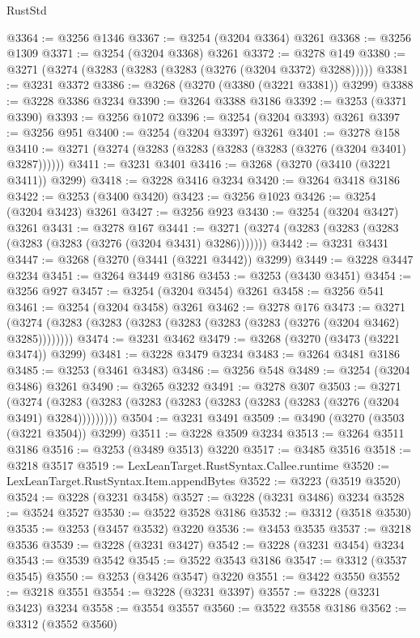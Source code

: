\begin{lexlean}{RustStd}
\begin{coremodule}
@3364 := @3256 @1346
@3367 := @3254 (@3204 @3364) @3261
@3368 := @3256 @1309
@3371 := @3254 (@3204 @3368) @3261
@3372 := @3278 @149
@3380 := @3271 (@3274 (@3283 (@3283 (@3283 (@3276 (@3204 @3372) @3288)))))
@3381 := @3231 @3372
@3386 := @3268 (@3270 (@3380 (@3221 @3381)) @3299)
@3388 := @3228 @3386 @3234
@3390 := @3264 @3388 @3186
@3392 := @3253 (@3371 @3390)
@3393 := @3256 @1072
@3396 := @3254 (@3204 @3393) @3261
@3397 := @3256 @951
@3400 := @3254 (@3204 @3397) @3261
@3401 := @3278 @158
@3410 := @3271 (@3274 (@3283 (@3283 (@3283 (@3283 (@3276 (@3204 @3401) @3287))))))
@3411 := @3231 @3401
@3416 := @3268 (@3270 (@3410 (@3221 @3411)) @3299)
@3418 := @3228 @3416 @3234
@3420 := @3264 @3418 @3186
@3422 := @3253 (@3400 @3420)
@3423 := @3256 @1023
@3426 := @3254 (@3204 @3423) @3261
@3427 := @3256 @923
@3430 := @3254 (@3204 @3427) @3261
@3431 := @3278 @167
@3441 := @3271 (@3274 (@3283 (@3283 (@3283 (@3283 (@3283 (@3276 (@3204 @3431) @3286)))))))
@3442 := @3231 @3431
@3447 := @3268 (@3270 (@3441 (@3221 @3442)) @3299)
@3449 := @3228 @3447 @3234
@3451 := @3264 @3449 @3186
@3453 := @3253 (@3430 @3451)
@3454 := @3256 @927
@3457 := @3254 (@3204 @3454) @3261
@3458 := @3256 @541
@3461 := @3254 (@3204 @3458) @3261
@3462 := @3278 @176
@3473 := @3271 (@3274 (@3283 (@3283 (@3283 (@3283 (@3283 (@3283 (@3276 (@3204 @3462) @3285))))))))
@3474 := @3231 @3462
@3479 := @3268 (@3270 (@3473 (@3221 @3474)) @3299)
@3481 := @3228 @3479 @3234
@3483 := @3264 @3481 @3186
@3485 := @3253 (@3461 @3483)
@3486 := @3256 @548
@3489 := @3254 (@3204 @3486) @3261
@3490 := @3265 @3232
@3491 := @3278 @307
@3503 := @3271
    (@3274 (@3283 (@3283 (@3283 (@3283 (@3283 (@3283 (@3283 (@3276 (@3204 @3491) @3284)))))))))
@3504 := @3231 @3491
@3509 := @3490 (@3270 (@3503 (@3221 @3504)) @3299)
@3511 := @3228 @3509 @3234
@3513 := @3264 @3511 @3186
@3516 := @3253 (@3489 @3513) @3220
@3517 := @3485 @3516
@3518 := @3218 @3517
@3519 := LexLeanTarget.RustSyntax.Callee.runtime
@3520 := LexLeanTarget.RustSyntax.Item.appendBytes
@3522 := @3223 (@3519 @3520)
@3524 := @3228 (@3231 @3458)
@3527 := @3228 (@3231 @3486) @3234
@3528 := @3524 @3527
@3530 := @3522 @3528 @3186
@3532 := @3312 (@3518 @3530)
@3535 := @3253 (@3457 @3532) @3220
@3536 := @3453 @3535
@3537 := @3218 @3536
@3539 := @3228 (@3231 @3427)
@3542 := @3228 (@3231 @3454) @3234
@3543 := @3539 @3542
@3545 := @3522 @3543 @3186
@3547 := @3312 (@3537 @3545)
@3550 := @3253 (@3426 @3547) @3220
@3551 := @3422 @3550
@3552 := @3218 @3551
@3554 := @3228 (@3231 @3397)
@3557 := @3228 (@3231 @3423) @3234
@3558 := @3554 @3557
@3560 := @3522 @3558 @3186
@3562 := @3312 (@3552 @3560)

\end{coremodule}
\end{lexlean}
